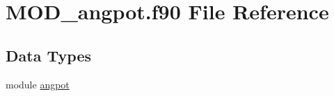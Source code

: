 \hypertarget{MOD__angpot_8f90}{\section{M\-O\-D\-\_\-angpot.\-f90 File Reference}
\label{MOD__angpot_8f90}
}
\subsection*{Data Types}
\begin{DoxyCompactItemize}
\item 
module \hyperlink{classangpot}{angpot}
\end{DoxyCompactItemize}
